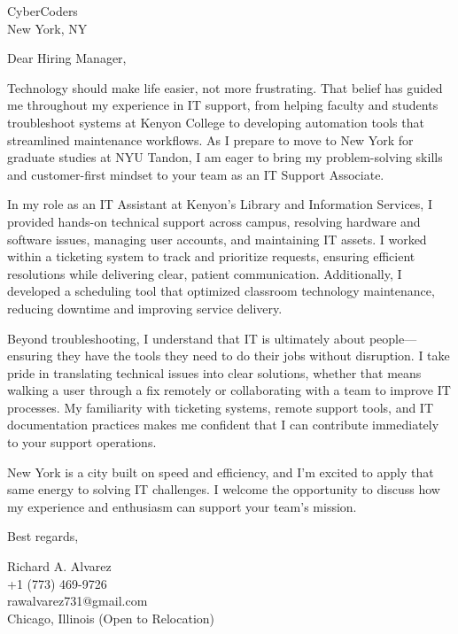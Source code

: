 \documentclass[a4paper,10pt]{letter}
\begin{document}
\begin{letter}{
CyberCoders \\
New York, NY}

\opening{Dear Hiring Manager,}

Technology should make life easier, not more frustrating. That belief has guided me throughout my experience in IT support, from helping faculty and students troubleshoot systems at Kenyon College to developing automation tools that streamlined maintenance workflows. As I prepare to move to New York for graduate studies at NYU Tandon, I am eager to bring my problem-solving skills and customer-first mindset to your team as an IT Support Associate.  

In my role as an IT Assistant at Kenyon’s Library and Information Services, I provided hands-on technical support across campus, resolving hardware and software issues, managing user accounts, and maintaining IT assets. I worked within a ticketing system to track and prioritize requests, ensuring efficient resolutions while delivering clear, patient communication. Additionally, I developed a scheduling tool that optimized classroom technology maintenance, reducing downtime and improving service delivery.  

Beyond troubleshooting, I understand that IT is ultimately about people—ensuring they have the tools they need to do their jobs without disruption. I take pride in translating technical issues into clear solutions, whether that means walking a user through a fix remotely or collaborating with a team to improve IT processes. My familiarity with ticketing systems, remote support tools, and IT documentation practices makes me confident that I can contribute immediately to your support operations.  

New York is a city built on speed and efficiency, and I’m excited to apply that same energy to solving IT challenges. I welcome the opportunity to discuss how my experience and enthusiasm can support your team’s mission.  

\closing{Best regards,}

Richard A. Alvarez \\
+1 (773) 469-9726 \\
rawalvarez731@gmail.com \\
Chicago, Illinois (Open to Relocation)

\end{letter}
\end{document}
